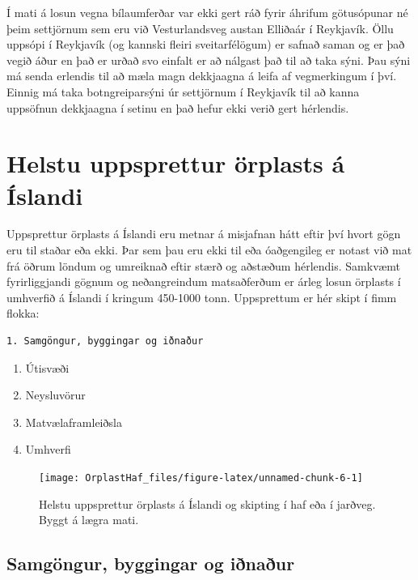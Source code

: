 \documentclass[icelandic,]{book}
\providecommand{\tightlist}{%
  \setlength{\itemsep}{0pt}\setlength{\parskip}{0pt}}
\begin{document}
Í mati á losun vegna bílaumferðar var ekki gert ráð fyrir áhrifum götusópunar né þeim settjörnum sem eru við Vesturlandsveg austan Elliðaár í Reykjavík. Öllu uppsópi í Reykjavík (og kannski fleiri sveitarfélögum) er safnað saman og er það vegið áður en það er urðað svo einfalt er að nálgast það til að taka sýni. Þau sýni má senda erlendis til að mæla magn dekkjaagna á leifa af vegmerkingum í því. Einnig má taka botngreiparsýni úr settjörnum í Reykjavík til að kanna uppsöfnun dekkjaagna í setinu en það hefur ekki verið gert hérlendis.

\hypertarget{helstu-uppsprettur-orplasts-a-islandi}{%
\chapter{Helstu uppsprettur örplasts á Íslandi}\label{helstu-uppsprettur-orplasts-a-islandi}}

Uppsprettur örplasts á Íslandi eru metnar á misjafnan hátt eftir því hvort gögn eru til staðar eða ekki. Þar sem þau eru ekki til eða óaðgengileg er notast við mat frá öðrum löndum og umreiknað eftir stærð og aðstæðum hérlendis. Samkvæmt fyrirliggjandi gögnum og neðangreindum matsaðferðum er árleg losun örplasts í umhverfið á Íslandi í kringum 450-1000 tonn. Uppsprettum er hér skipt í fimm flokka:

\begin{verbatim}
1. Samgöngur, byggingar og iðnaður
\end{verbatim}

\begin{enumerate}
\def\labelenumi{\arabic{enumi}.}
\setcounter{enumi}{1}
\tightlist
\item
  Útisvæði
\item
  Neysluvörur
\item
  Matvælaframleiðsla
\item
  Umhverfi
\end{enumerate}

\begin{figure}

{\centering \texttt{[image: OrplastHaf\_files/figure-latex/unnamed-chunk-6-1]} 

}

\caption{Helstu uppsprettur örplasts á Íslandi og skipting í haf eða í jarðveg. Byggt á lægra mati.}\label{fig:unnamed-chunk-6}
\end{figure}

\hypertarget{samgongur-byggingar-og-inaur}{%
\section*{Samgöngur, byggingar og iðnaður}\label{samgongur-byggingar-og-inaur}}
\end{document}
